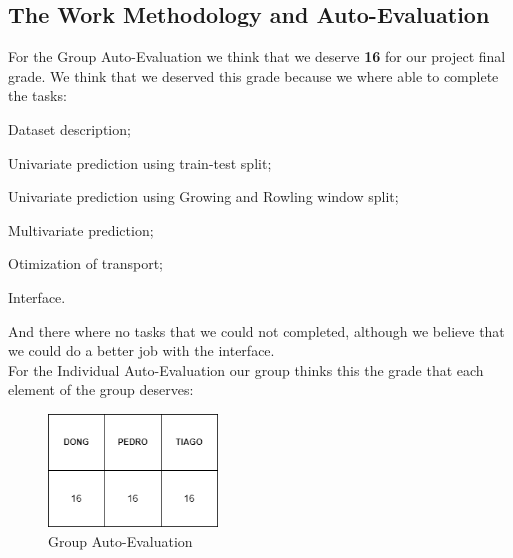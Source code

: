 \newpage

\subsection{The Work Methodology and Auto-Evaluation}
For the Group Auto-Evaluation we think that we deserve {\bfseries 16} for our project final grade. We think that we deserved this grade because we where able to complete the tasks:

\quad \textbullet Dataset description;

\quad \textbullet Univariate prediction using train-test split;

\quad \textbullet Univariate prediction using Growing and Rowling window split;

\quad \textbullet Multivariate prediction;

\quad \textbullet Otimization of transport;

\quad \textbullet Interface.

And there where no tasks that we could not completed, although we believe that we could do a better job with the interface.\\

For the Individual Auto-Evaluation our group thinks this the grade that each element of the group deserves:
\\
\begin{figure}[H]
    \centering
    \includegraphics[width=0.4\textwidth]{assets/notas.png}
    \caption{Group Auto-Evaluation}
    \label{fig:notas}
    \end{figure}